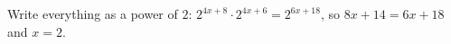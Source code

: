 Write everything as a power of $2$: $2^{4x+8}\cdot2^{4x+6}=2^{6x+18}$, so $8x+14=6x+18$ and $x=\boxed{2}$.
